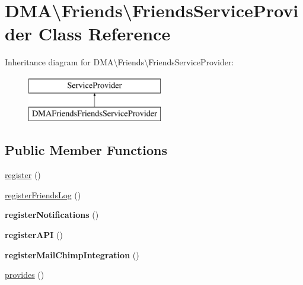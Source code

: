 \hypertarget{classDMA_1_1Friends_1_1FriendsServiceProvider}{}\section{D\+M\+A\textbackslash{}Friends\textbackslash{}Friends\+Service\+Provider Class Reference}
\label{classDMA_1_1Friends_1_1FriendsServiceProvider}
Inheritance diagram for D\+M\+A\textbackslash{}Friends\textbackslash{}Friends\+Service\+Provider\+:\begin{figure}[H]
\begin{center}
\leavevmode
\includegraphics[height=2.000000cm]{df/d6d/classDMA_1_1Friends_1_1FriendsServiceProvider}
\end{center}
\end{figure}
\subsection*{Public Member Functions}
\begin{DoxyCompactItemize}
\item 
\hyperlink{classDMA_1_1Friends_1_1FriendsServiceProvider_a6a90d2cdc4c6b153b45764ba66e154ae}{register} ()
\item 
\hyperlink{classDMA_1_1Friends_1_1FriendsServiceProvider_a2d6ff7101ca6389c00e298f2d594a1df}{register\+Friends\+Log} ()
\item 
\hypertarget{classDMA_1_1Friends_1_1FriendsServiceProvider_a4a51f5a9c32c49373284c0b35f8dfd35}{}{\bfseries register\+Notifications} ()\label{classDMA_1_1Friends_1_1FriendsServiceProvider_a4a51f5a9c32c49373284c0b35f8dfd35}

\item 
\hypertarget{classDMA_1_1Friends_1_1FriendsServiceProvider_a36966f2e276697e1143a2d670680122b}{}{\bfseries register\+A\+P\+I} ()\label{classDMA_1_1Friends_1_1FriendsServiceProvider_a36966f2e276697e1143a2d670680122b}

\item 
\hypertarget{classDMA_1_1Friends_1_1FriendsServiceProvider_a0210439bcb1f44a73b2f7f20df03255b}{}{\bfseries register\+Mail\+Chimp\+Integration} ()\label{classDMA_1_1Friends_1_1FriendsServiceProvider_a0210439bcb1f44a73b2f7f20df03255b}

\item 
\hyperlink{classDMA_1_1Friends_1_1FriendsServiceProvider_ae78ebc84a7fa9e620e7cbc7b53020964}{provides} ()
\end{DoxyCompactItemize}
